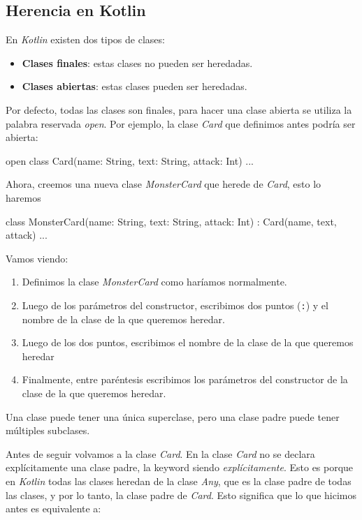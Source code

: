 
\subsection{Herencia en Kotlin}
  En \textit{Kotlin} existen dos tipos de clases:

  \begin{itemize}
    \item \textbf{Clases finales}: estas clases no pueden ser heredadas.
    \item \textbf{Clases abiertas}: estas clases pueden ser heredadas.
  \end{itemize}

  Por defecto, todas las clases son finales, para hacer una clase abierta se utiliza la palabra
  reservada \textit{open}.
  Por ejemplo, la clase \textit{Card} que definimos antes podría ser abierta:

  \begin{kotlin}
    open class Card(name: String, text: String, attack: Int) {...} 
  \end{kotlin}

  Ahora, creemos una nueva clase \textit{MonsterCard} que herede de \textit{Card}, esto lo haremos
                        
  \begin{kotlin}
    class MonsterCard(name: String, text: String, attack: Int) : Card(name, text, attack) {
      ...
    }
  \end{kotlin}

  Vamos viendo:
  \begin{enumerate}
    \item Definimos la clase \textit{MonsterCard} como haríamos normalmente.
    \item Luego de los parámetros del constructor, escribimos dos puntos (\texttt{:}) y el nombre
      de la clase de la que queremos heredar.
    \item Luego de los dos puntos, escribimos el nombre de la clase de la que queremos heredar
    \item Finalmente, entre paréntesis escribimos los parámetros del constructor de la clase
      de la que queremos heredar.
  \end{enumerate}

  \begin{important}
    Una clase puede tener una única superclase, pero una clase padre puede tener múltiples
    subclases.
  \end{important}

  Antes de seguir volvamos a la clase \textit{Card}.
  En la clase \textit{Card} no se declara explícitamente una clase padre, la keyword siendo 
  \textit{explícitamente}.
  Esto es porque en \textit{Kotlin} todas las clases heredan de la clase \textit{Any}, que es la
  clase padre de todas las clases, y por lo tanto, la clase padre de \textit{Card}.
  Esto significa que lo que hicimos antes es equivalente a:

